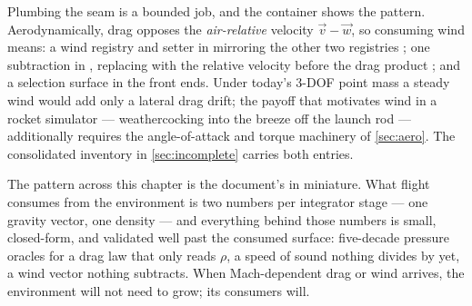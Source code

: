 Plumbing the seam is a bounded job, and the container shows the pattern. Aerodynamically,
drag opposes the \emph{air-relative} velocity $\vec v - \vec w$, so consuming wind means: a
wind registry and setter in  mirroring the other two registries
; one subtraction in , replacing
 with the relative velocity before the drag product
; and a selection surface in the front ends. Under today's
3-DOF point mass a steady wind would add only a lateral drag drift; the payoff that
motivates wind in a rocket simulator --- weathercocking into the breeze off the launch rod
--- additionally requires the angle-of-attack and torque machinery of \cref{sec:aero}. The
consolidated inventory in \cref{sec:incomplete} carries both entries.

The pattern across this chapter is the document's in miniature. What flight consumes from
the environment is two numbers per integrator stage --- one gravity vector, one density ---
and everything behind those numbers is small, closed-form, and validated well past the
consumed surface: five-decade pressure oracles for a drag law that only reads $\rho$, a
speed of sound nothing divides by yet, a wind vector nothing subtracts. When Mach-dependent
drag or wind arrives, the environment will not need to grow; its consumers will.
